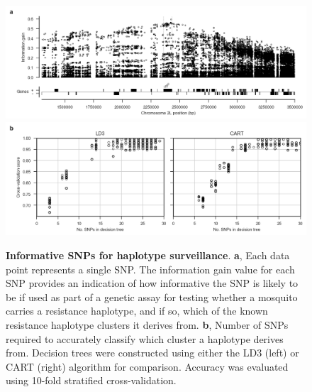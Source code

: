 \documentclass[a4paper,11pt,abstracton,hidelinks]{scrartcl}
\begin{document}
%
\begin{figure}[!t]
  \centering
  
  \includegraphics[width=1.0\linewidth]{artwork/info_gain.png}
  \includegraphics[width=1.0\linewidth]{artwork/tree_cv.png}
  
  \caption{%
%
\textbf{Informative SNPs for haplotype surveillance}. 
%
\textbf{a}, Each data point represents a single SNP. 
%
The information gain value for each SNP provides an indication of how informative the SNP is likely to be if used as part of a genetic assay for testing whether a mosquito carries a resistance haplotype, and if so, which of the known resistance haplotype clusters it derives from. 
%
\textbf{b}, Number of SNPs required to accurately classify which cluster a haplotype derives from. 
%
Decision trees were constructed using either the LD3 (left) or CART (right) algorithm for comparison.
%
Accuracy was evaluated using 10-fold stratified cross-validation.
}

  \label{fig:gain}
\end{figure}
\end{document}
